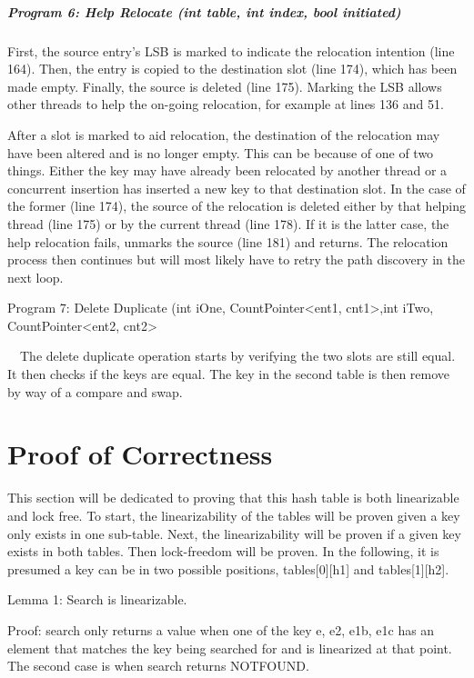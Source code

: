 \documentclass{article}
\begin{document}
\subparagraph{Program 6: Help Relocate (int table, int index, bool initiated)}

\bigskip

First, the source entry's LSB is marked to indicate the relocation intention (line 164). Then, the entry is copied to
the destination slot (line 174), which has been made empty. Finally, the source is deleted (line 175). Marking the LSB
allows other threads to help the on-going relocation, for example at lines 136 and 51.

After a slot is marked to aid relocation, the destination of the relocation may have been altered and is no longer
empty. This can be because of one of two things. Either the key may have already been relocated by another thread or a
concurrent insertion has inserted a new key to that destination slot. In the case of the former (line 174), the source
of the relocation is deleted either by that helping thread (line 175) or by the current thread (line 178). If it is the
latter case, the help relocation fails, unmarks the source (line 181) and returns. The relocation process then
continues but will most likely have to retry the path discovery in the next loop.

Program 7: Delete Duplicate (int iOne, CountPointer{\textless}ent1, cnt1{\textgreater},int iTwo,
CountPointer{\textless}ent2, cnt2{\textgreater}


\bigskip

\ \ The delete duplicate operation starts by verifying the two slots are still equal. It then checks if the keys are
equal. The key in the second table is then remove by way of a compare and swap.

\section[Proof of Correctness]{Proof of Correctness}
This section will be dedicated to proving that this hash table is both linearizable and lock free. To start, the
linearizability of the tables will be proven given a key only exists in one sub-table. Next, the linearizability will
be proven if a given key exists in both tables. Then lock-freedom will be proven. In the following, it is presumed a
key can be in two possible positions, tables[0][h1] and tables[1][h2].

Lemma 1: Search is linearizable.

Proof: search only returns a value when one of the key e, e2, e1b, e1c has an element that matches the key being
searched for and is linearized at that point. The second case is when search returns NOTFOUND.
\end{document}
